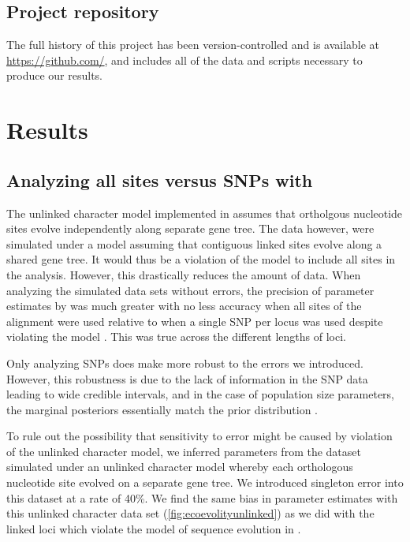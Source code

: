 \subsection{Project repository}
The full history of this project has been version-controlled and is available
at
\url{https://github.com/},
and includes
all of the data and scripts necessary to produce our results.


\section{Results}

\subsection{Analyzing all sites versus SNPs with \ecoevolity}

The unlinked character model implemented in \ecoevolity assumes that ortholgous 
nucleotide sites evolve independently along separate gene tree. The data however, were
simulated under a model assuming that contiguous linked sites evolve along a shared 
gene tree. It would thus be a violation of the \ecoevolity model to include all
sites in the analysis. However, this drastically reduces the amount of data.    
When analyzing the simulated data sets without errors, the precision of
parameter estimates by \ecoevolity was much greater with no less accuracy 
when all sites of the alignment were used relative to when a single SNP per 
locus was used despite violating the model \mainfigsp. This was true across the 
different lengths of loci.


Only analyzing SNPs does make \ecoevolity more robust to the errors
we introduced.
However, this robustness is due to the lack of information in the
SNP data leading to wide credible intervals, and in the case of
population size parameters, the marginal posteriors essentially
match the prior distribution \thetafigsp.

To rule out the possibility that sensitivity to error might be caused by
violation of the unlinked character model, we inferred parameters from the 
dataset simulated under an unlinked character model whereby each orthologous
nucleotide site evolved on a separate gene tree. We introduced singleton error 
into this dataset at a rate of 40\%. We find the same bias in parameter estimates
with this unlinked character data set (\cref{fig:ecoevolityunlinked}) as we did 
with the linked loci which violate the model of sequence evolution in 
\ecoevolity \timefigsp.

